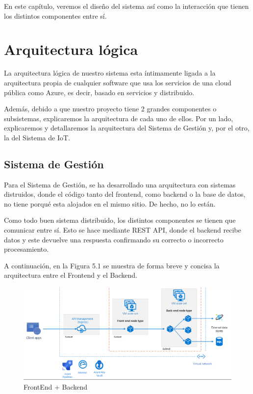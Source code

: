 En este capítulo, veremos el diseño del sistema así como la interacción que tienen los distintos componentes entre sí.

\newpage

\section{Arquitectura lógica}
La arquitectura lógica de nuestro sistema esta íntimamente ligada a la arquitectura propia de cualquier software que usa los servicios de una cloud pública como Azure, es decir, basado en servicios y distribuido.

Además, debido a que nuestro proyecto tiene 2 grandes componentes o subsistemas, explicaremos la arquitectura de cada uno de ellos. Por un lado, explicaremos y detallaremos la arquitectura del Sistema de Gestión y, por el otro, la del Sistema de IoT.

\subsection{Sistema de Gestión}
Para el Sistema de Gestión, se ha desarrollado una arquitectura con sistemas distruidos, donde el código tanto del frontend, como backend o la base de datos, no tiene porqué esta alojados en el mismo sitio. De hecho, no lo están.

Como todo buen sistema distribuido, los distintos componentes se tienen que comunicar entre sí. Esto se hace mediante REST API, donde el backend recibe datos y este devuelve una respuesta confirmando su correcto o incorrecto procesamiento.

A continuación, en la Figura 5.1 se muestra de forma breve y concisa la arquitectura entre el Frontend y el Backend.

\begin{figure}[H]
    \centering
    \includegraphics[width=1\linewidth]{images/design/front-back.png}
    \caption{FrontEnd + Backend \cite{frontbackazure}}
\end{figure}

